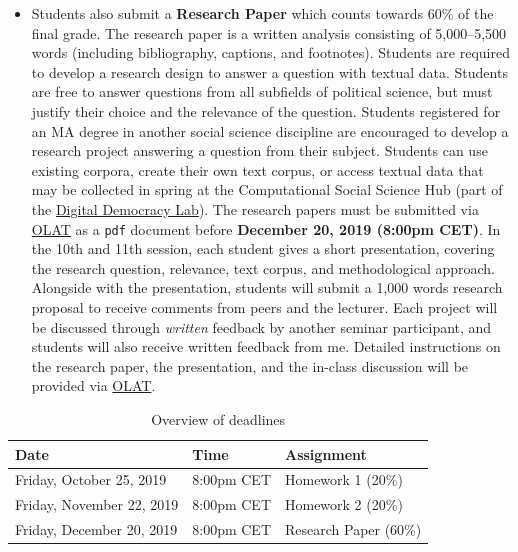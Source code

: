 \documentclass[abstract=on,parskip=full,headings=standardclasses,fontsize=11pt,paper=a4]{scrartcl}
\begin{document}
\begin{itemize}
\item Students also submit a \textbf{Research Paper} which counts towards 60\% of the final grade. The research paper is a written analysis consisting of 5,000--5,500 words (including bibliography, captions, and footnotes). Students are required to develop a research design to answer a question with textual data. Students are free to answer questions from all subfields of political science, but must justify their choice and the relevance of the question.  Students registered for an MA degree in another social science discipline are encouraged to develop a research project answering a question from their subject.   Students can use existing corpora, create their own text corpus, or access textual data that may be collected in spring at the Computational Social Science Hub (part of the \href{https://digdemlab.github.io}{Digital Democracy Lab}).  The research papers must be submitted via \href{https://lms.uzh.ch/url/RepositoryEntry/16539681118?guest=true&lang=en}{OLAT} as a \texttt{pdf} document before \textbf{December 20, 2019 (8:00pm CET)}.  In the 10th and 11th session, each student gives a  short  presentation, covering the research question, relevance, text corpus, and methodological approach. Alongside with the presentation,  students will submit a 1,000 words research proposal to receive comments from peers and the lecturer. Each project will be discussed through \textit{written} feedback by another seminar participant, and students will also receive written feedback from me. Detailed instructions on the research paper, the presentation, and the in-class discussion will be provided via \href{https://lms.uzh.ch/url/RepositoryEntry/16539681118?guest=true&lang=en}{OLAT}.
\end{itemize}



\begin{table}[h] \centering \onehalfspacing
\caption*{Overview of deadlines}
\begin{tabular}{ l l l} 
\toprule
Date &  Time & Assignment \\
\midrule
Friday, October 25, 2019 & 8:00pm CET &  Homework 1 (20\%)  \\
Friday, November 22, 2019 & 8:00pm CET  & Homework 2 (20\%) \\
Friday, December 20, 2019 & 8:00pm CET & Research Paper  (60\%) \\
\bottomrule
\end{tabular}
\end{table}
\end{document}

